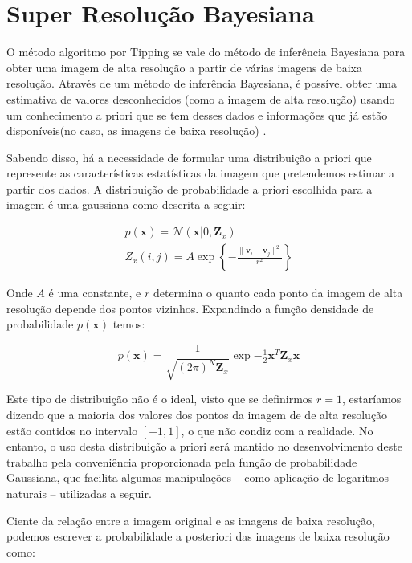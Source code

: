 \chapter{Super Resolução Bayesiana}
\label{chap:srbayes}
O método algoritmo por Tipping se vale do método de inferência Bayesiana para obter uma imagem de alta resolução a partir de várias imagens de baixa resolução.
Através de um método de inferência Bayesiana, é possível obter uma estimativa de valores desconhecidos (como a imagem de alta resolução) usando um conhecimento a priori que se tem desses dados e informações que já estão disponíveis(no caso, as imagens de baixa resolução) \cite{therrien2011probability}.

Sabendo disso, há a necessidade de formular uma distribuição a priori que represente as características estatísticas da imagem que pretendemos estimar a partir dos dados.
A distribuição de probabilidade a priori escolhida para a imagem é uma gaussiana como descrita a seguir:

\begin{gather}
	p(\mathbf{x}) = \mathcal{N}(\mathbf{x} | 0, \mathbf{Z}_x) \\ 
	Z_x(i,j) = A \exp \left\{ - \frac{\|\mathbf{v}_i - \mathbf{v}_j \|^2}{r^2} \right\}
\end{gather}

Onde $A$ é uma constante, e $r$ determina o quanto cada ponto da imagem de alta resolução depende dos pontos vizinhos.
Expandindo a função densidade de probabilidade $p(\mathbf{x})$ temos:

\begin{equation}
	p(\mathbf{x}) = \frac{1}{\sqrt{(2\pi)^N \mathbf{Z}_x}}\exp{-\tfrac{1}{2} \mathbf{x}^T \mathbf{Z}_x \mathbf{x}}
\end{equation}

Este tipo de distribuição não é o ideal, visto que se definirmos $r=1$, estaríamos dizendo que a maioria dos valores dos pontos da imagem de de alta resolução estão contidos no intervalo $[-1,1]$, o que não condiz com a realidade.
No entanto, o uso desta distribuição a priori será mantido no desenvolvimento deste trabalho pela conveniência proporcionada pela função de probabilidade Gaussiana, que facilita algumas manipulações -- como aplicação de logaritmos naturais --  utilizadas a seguir.

Ciente da relação entre a imagem original e as imagens de baixa resolução, podemos escrever a probabilidade a posteriori das imagens de baixa resolução como:

